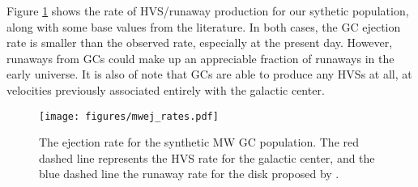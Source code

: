 \documentclass[twocolumn]{aastex631}
\newcommand{\kms}{${\rm km~s^{-1}}$}
\newcommand{\CMC}{\texttt{CMC}}
\begin{document}
Figure \ref{fig:mwej_rates} shows the rate of HVS/runaway production for our sythetic population, along with some base values from the literature.
In both cases, the GC ejection rate is smaller than the observed rate, especially at the present day.
However, runaways from GCs could make up an appreciable fraction of runaways in the early universe.
It is also of note that GCs are able to produce any HVSs at all, at velocities previously associated entirely with the galactic center.

\begin{figure}
    \begin{centering}
        \texttt{[image: figures/mwej\_rates.pdf]}
        \caption{
            The ejection rate for the synthetic MW GC population.
            The red dashed line represents the HVS rate for the galactic center, and the blue dashed line the runaway rate for the disk proposed by \citep{2015ARA&A..53...15B}.
        }
        \label{fig:mwej_rates}
    \end{centering}
\end{figure}


%
\end{document}
